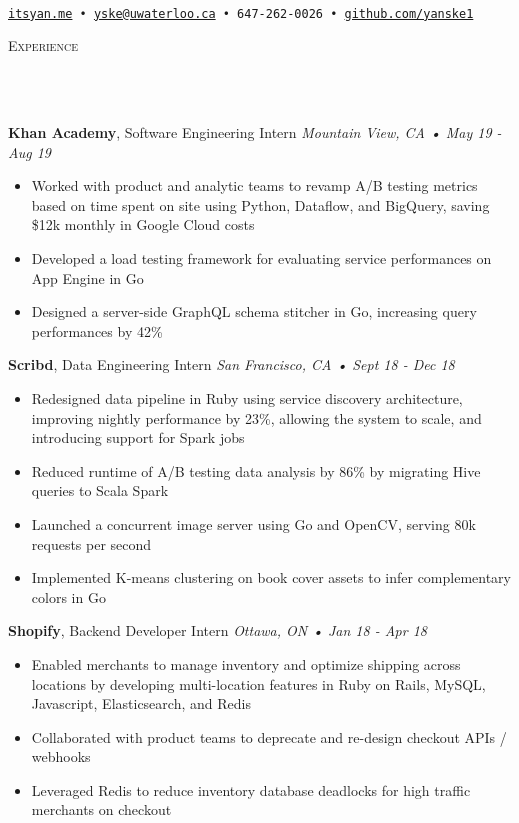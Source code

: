 \documentclass[a4paper, 11pt, hidelinks]{article}
\newcommand{\lineunder} {
    \vspace*{-8pt} \\
    \hrulefill \\
}
\newcommand{\header} [1] {
    \color{bigtext}
    {\hspace*{-4pt}\vspace*{6pt} \textsc{#1}}
    \vspace*{-6pt}
    \color{bodytext}
    \lineunder
    \vspace{6pt}
}
\newcommand{\jobheader} [4] {
    \color{bigtext}\textbf{#1}, #2 \color{weaktext}\hfill\textit{#3 • #4}\\
    \vspace{-2mm} \color{bodytext}
}
\begin{document}
\vspace*{-35pt}
\begin{center}
	\text{\fontsize{35}{40} \selectfont \color{bigtext}{Yan Ke}}\\
    \vspace{10pt}
    \color{weaktext}
    \texttt{\href{http://www.itsyan.me}{itsyan.me} • \href{mailto:yske@uwaterloo.ca}{yske@uwaterloo.ca} • 647-262-0026 •
    \href{http://www.github.com/yanske1}{github.com/yanske1}}
\end{center}
\vspace{-2pt}

\header{Experience}
\jobheader{Khan Academy}{Software Engineering Intern}{Mountain View, CA}{May 19 - Aug 19}
\begin{itemize}[leftmargin=2em] \itemsep 1pt 
    \item Worked with product and analytic teams to revamp A/B testing metrics based on time spent on site
    using Python, Dataflow, and BigQuery, saving \$12k monthly in Google Cloud costs
    \item Developed a load testing framework for evaluating service performances on App Engine in Go
    \item Designed a server-side GraphQL schema stitcher in Go, increasing query performances by 42\%
\end{itemize}

\jobheader{Scribd}{Data Engineering Intern}{San Francisco, CA}{Sept 18 - Dec 18}
\begin{itemize}[leftmargin=2em] \itemsep 1pt \color{bodytext}
	\item Redesigned data pipeline in Ruby using service discovery architecture, improving nightly performance
    by 23\%, allowing the system to scale, and introducing support for Spark jobs
	\item Reduced runtime of A/B testing data analysis by 86\% by migrating Hive queries to Scala Spark
	\item Launched a concurrent image server using Go and OpenCV, serving 80k requests per second
	\item Implemented K-means clustering on book cover assets to infer complementary colors in Go
\end{itemize}

\jobheader{Shopify}{Backend Developer Intern}{Ottawa, ON}{Jan 18 - Apr 18}
\begin{itemize}[leftmargin=2em] \itemsep 1pt \color{bodytext}
	\item Enabled merchants to manage inventory and optimize shipping across locations by developing
    multi-location features in Ruby on Rails, MySQL, Javascript, Elasticsearch, and Redis
	\item Collaborated with product teams to deprecate and re-design checkout APIs / webhooks
	\item Leveraged Redis to reduce inventory database deadlocks for high traffic merchants on checkout
\end{itemize}
\end{document}
